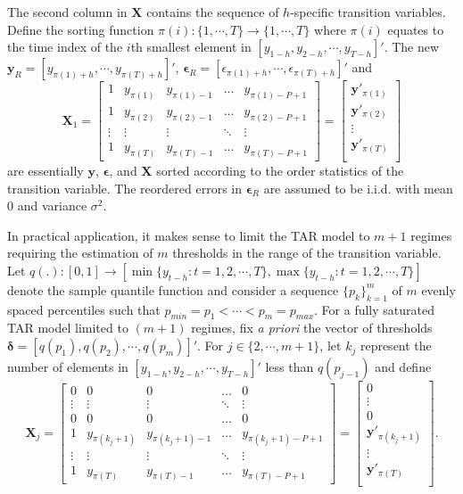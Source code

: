 The second column in $\bm{X}$ contains the sequence of $h$-specific transition variables. Define the sorting function $\pi(i):\{1,\cdots,T\}\to\{1,\cdots,T\}$   where $\pi(i)$ equates to the time index of the $i$th smallest element in $[y_{1-h},y_{2-h},\cdots,y_{T-h}]'$. The new $\bm{y}_R=[y_{\pi(1)+h},\cdots,y_{\pi(T)+h}]'$, $\bm{\epsilon}_R=[\epsilon_{\pi(1)+h},\cdots,\epsilon_{\pi(T)+h}]'$ and 
$$
\bm{X}_1=\begin{bmatrix}
    1 & y_{\pi(1)} & y_{\pi(1)-1} & \dots  & y_{\pi(1)-P+1} \\
    1 & y_{\pi(2)} & y_{\pi(2)-1} & \dots  & y_{\pi(2)-P+1} \\
    \vdots & \vdots & \vdots & \ddots & \vdots \\
    1 & y_{\pi(T)} & y_{\pi(T)-1} & \dots  & y_{\pi(T)-P+1}
\end{bmatrix}=
\begin{bmatrix}
\bm{y}'_{\pi(1)} \\
\bm{y}'_{\pi(2)} \\
\vdots \\
\bm{y}'_{\pi(T)} \\
\end{bmatrix}
$$
are essentially $\bm{y}$, $\bm{\epsilon}$, and $\bm{X}$ sorted according to the order statistics of the transition variable. The reordered errors in $\bm{\epsilon}_R$ are assumed to be i.i.d. with mean $0$ and variance $\sigma^2$.

In practical application, it makes sense to limit the TAR model to $m+1$ regimes requiring the estimation of $m$ thresholds in the range of the transition variable. Let $q(.): [0,1]\to[\min\{y_{t-h}:t=1,2,\cdots,T\},\max\{y_{t-h}:t=1,2,\cdots,T\}]$ denote the sample quantile function and consider a sequence $\{p_k\}_{k=1}^m$ of $m$ evenly spaced percentiles such that $p_{min}=p_1<\cdots<p_m=p_{max}$. For a fully saturated TAR model limited to $(m+1)$ regimes, fix \textit{a priori} the vector of thresholds $\bm{\delta}=[q(p_{1}),q(p_2),\cdots,q(p_{m})]'$. For $j \in \{2,\cdots,m+1\}$, let $k_j$ represent the number of elements in $[y_{1-h},y_{2-h},\cdots,y_{T-h}]'$ less than $q(p_{j-1})$ and  define 
$$\bm{X}_j=
\begin{bmatrix}
    0 & 0 & 0 & \dots  & 0 \\
    \vdots & \vdots & \vdots & \ddots & \vdots \\
    0 & 0 & 0 & \dots  & 0 \\
    1 & y_{\pi(k_j+1)} & y_{\pi(k_j+1)-1} & \dots  & y_{\pi(k_j+1)-P+1} \\
    \vdots & \vdots & \vdots & \ddots & \vdots \\
    1 & y_{\pi(T)} & y_{\pi(T)-1} & \dots  & y_{\pi(T)-P+1}
\end{bmatrix}=
\begin{bmatrix}
0 \\
\vdots \\
0\\
\bm{y}'_{\pi(k_j+1)} \\
\vdots \\
\bm{y}'_{\pi(T)} \\
\end{bmatrix}.
$$


